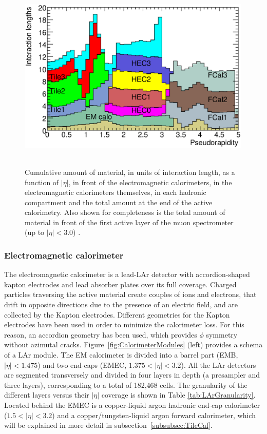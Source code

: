 \begin{figure}[!ht]
  \begin{center}
    \mbox{
      \includegraphics[width=0.995\textwidth]{ATLASdetector/Figures/CalorimeterRadiationLength.eps}
    }
  \end{center}
  \caption[Cumulative amount of material in the calorimeters and the first layer of the muon spectrometer.]{Cumulative amount of material, in units of interaction length, as a function of $|\eta|$, in front of the electromagnetic calorimeters, in the electromagnetic calorimeters themselves, in each hadronic compartment and the total amount at the end of the active calorimetry. Also shown for completeness is the total amount of material in front of the first active layer of the muon spectrometer (up to $|\eta|<3.0$) \protect\cite{Aad:2008zzm}.}
  \label{fig:InteractionLengthCalo}
\end{figure}


\subsubsection{Electromagnetic calorimeter}
    \label{subsubsec:LAr}

The electromagnetic calorimeter is a lead-LAr detector with accordion-shaped kapton electrodes and lead absorber plates over its full coverage.
Charged particles traversing the active material create couples of ions and electrons, that drift in opposite directions due to the presence of an electric field, and are collected by the Kapton electrodes. 
Different geometries for the Kapton electrodes have been used in order to minimize the calorimeter loss. 
For this reason, an accordion geometry has been used, which provides $\phi$ symmetry without azimutal cracks. 
Figure~\ref{fig:CalorimeterModules} (left) provides a schema of a LAr module.
The EM calorimeter is divided into a barrel part (EMB, $|\eta|<1.475$) and two end-caps (EMEC, $1.375<|\eta|<3.2$). 
All the LAr detectors are segmented transversely and divided in four layers in depth (a presampler and three layers), corresponding to a total of 182,468 cells.
The granularity of the different layers versus their $|\eta|$ coverage is shown in Table \ref{tab:LArGranularity}.
Located behind the EMEC is a copper-liquid argon hadronic end-cap calorimeter ($1.5<|\eta|<3.2$) and a copper/tungsten-liquid argon forward calorimeter, which will be explained in more detail in subsection~\ref{subsubsec:TileCal}.

